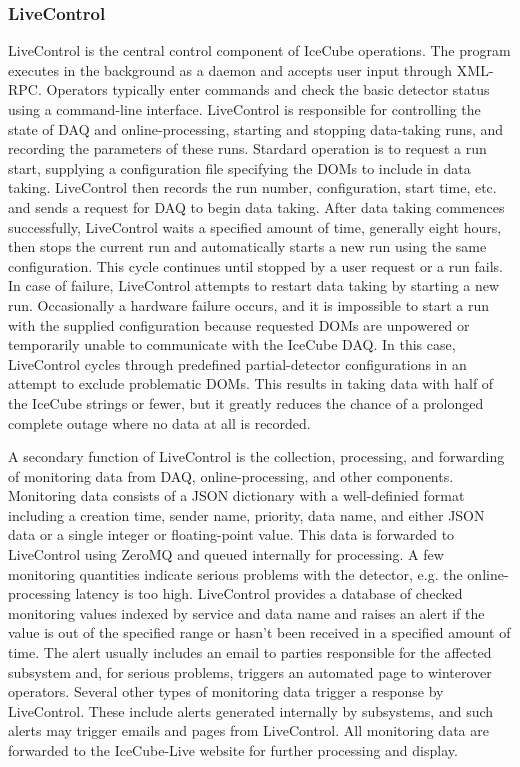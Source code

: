 \subsubsection{LiveControl}

LiveControl is the central control component of IceCube operations.  The program executes in the background as a daemon and accepts user input
through XML-RPC.  Operators typically enter commands and check the basic detector status using a command-line interface.  LiveControl is
responsible for controlling the state of DAQ and online-processing, starting and stopping data-taking runs, and recording
the parameters of these runs.  Stardard operation is to request a run start, supplying a configuration file specifying the DOMs to include in
data taking.  LiveControl then records the run number, configuration, start time, etc. and sends a request for DAQ to
begin data taking.  After data taking commences successfully, LiveControl waits a specified amount of time, generally eight
hours, then stops the current run and automatically starts a new run using the same configuration.  This cycle continues until
stopped by a user request or a run fails.  In case of failure, LiveControl attempts to restart data taking by starting a new
run.  Occasionally a hardware failure occurs, and it is impossible to start a run with the supplied configuration because requested DOMs are
unpowered or temporarily unable to communicate with the IceCube DAQ.  In this case, LiveControl cycles through predefined partial-detector
configurations in an attempt to exclude problematic DOMs.  This results in taking data with half of the IceCube strings or fewer, but it
greatly reduces the chance of a prolonged complete outage where no data at all is recorded.

A secondary function of LiveControl is the collection, processing, and forwarding of monitoring data from DAQ, online-processing, and other components.
Monitoring data consists of a JSON dictionary with a well-definied format including a creation time, sender name, priority, data name, and either JSON data
or a single integer or floating-point value.  This data is forwarded to LiveControl using ZeroMQ and queued internally for processing.  A few monitoring
quantities indicate serious problems with the detector, e.g. the online-processing latency is too high.  LiveControl provides a database of checked monitoring
values indexed by service and data name and raises an alert if the value is out of the specified range or hasn't been received in a specified amount of time.
The alert usually includes an email to parties responsible for the affected subsystem and, for serious problems, triggers an automated page to winterover operators.
Several other types of monitoring data trigger a response by LiveControl.  These include alerts generated internally by subsystems, and such alerts may trigger emails
and pages from LiveControl.  All monitoring data are forwarded to the IceCube-Live website for further processing and display.


